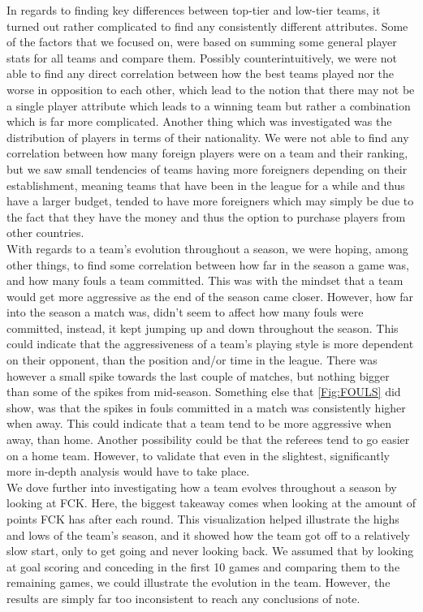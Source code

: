 \documentclass[Report.tex]{subfiles}
\begin{document}
In regards to finding key differences between top-tier and low-tier teams, it turned out rather complicated to find any consistently different attributes. Some of the factors that we focused on, were based on summing some general player stats for all teams and compare them. Possibly counterintuitively, we were not able to find any direct correlation between how the best teams played nor the worse in opposition to each other, which lead to the notion that there may not be a single player attribute which leads to a winning team but rather a combination which is far more complicated. Another thing which was investigated was the distribution of players in terms of their nationality. We were not able to find any correlation between how many foreign players were on a team and their ranking, but we saw small tendencies of teams having more foreigners depending on their establishment, meaning teams that have been in the league for a while and thus have a larger budget, tended to have more foreigners which may simply be due to the fact that they have the money and thus the option to purchase players from other countries. \\
With regards to a team's evolution throughout a season, we were hoping, among other things, to find some correlation between how far in the season a game was, and how many fouls a team committed.
This was with the mindset that a team would get more aggressive as the end of the season came closer. However, how far into the season a match was, didn't seem to affect how many fouls were committed, instead, it kept jumping up and down throughout the season. This could indicate that the aggressiveness of a team's playing style is more dependent on their opponent, than the position and/or time in the league. There was however a small spike towards the last couple of matches, but nothing bigger than some of the spikes from mid-season. Something else that \ref{Fig:FOULS} did show, was that the spikes in fouls committed in a match was consistently higher when away. This could indicate that a team tend to be more aggressive when away, than home. Another possibility could be that the referees tend to go easier on a home team. However, to validate that even in the slightest, significantly more in-depth analysis would have to take place. \\

We dove further into investigating how a team evolves throughout a season by looking at FCK. Here, the biggest takeaway comes when looking at the amount of points FCK has after each round. This visualization helped illustrate the highs and lows of the team’s season, and it showed how the team got off to a relatively slow start, only to get going and never looking back. We assumed that by looking at goal scoring and conceding in the first 10 games and comparing them to the remaining games, we could illustrate the evolution in the team. However, the results are simply far too inconsistent to reach any conclusions of note. 
\end{document}
